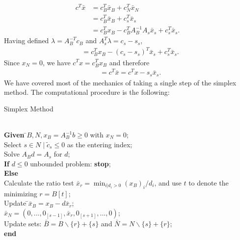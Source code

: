 \documentclass[a4paper,10 pt,titlepage,twoside]{book}
\theoremstyle{plain}
\theoremstyle{definition}
\theoremstyle{remark}
\begin{document}
\begin{align*}
c^{T}\bar{x} &=c^{T}_{B}\bar{x}_{B}+c^{T}_{N}\bar{x}_{N}\\
			 &=c_{B}^{T}\bar{x}_{B}+c^{T}_{s}\bar{x}_{s}\\
			 &=c_{B}^{T}x_{B}-c^{T}_{B}A_{B}^{-1}A_{s}\bar{x}_{s}+c_{s}^{T}\bar{x}_{s}.
\end{align*}
Having defined $ \lambda=A_{B}^{-T}c_{B}$ and $A^{T}_{s}\lambda = c_{s}-s_{s}$,
\begin{align*}
&= c^{T}_{B}x_{B}-(c_{s} -s_{s})^{T}\bar{x}_{s} +c_{s}^{T}\bar{x}_{s}.
\end{align*}
Since $x_{N}=0$, we have $c^{T}x=c^{T}_{B}x_{B}$ and therefore 
\begin{align*}
  &=c^{T}\bar{x} = c^{T}x - s_{s}\bar{x}_{s}.
\end{align*}
We have covered most of the mechanics of taking a single step of the simplex method. The computational procedure is the following:
\\
\begin{algorithm}[H]\caption{\label{Alg:1}Simplex Method}
\begin{tabbing}
	\\
	\textbf{Given} \=$B, N, x_{B} = A_{B}^{-1}b\geq 0$ with $x_{N}=0$;\\
	\> Select $s\in N\;|\;\widetilde{c}_{s}\leq 0$ as the entering index;\\
	\> Solve $A_{B}d = A_{s}$ for $d$;\\
	\>\textbf{If} {$d \leq 0$} unbounded problem: \textbf{stop};\\
	\>\textbf{Else} \=\\
	\>\>Calculate the ratio test $\bar{x}_{r} = \min_{i | d_{i} > 0}(x_{B})_{i}/d_{i}$, and use $t$ to denote the minimizing $r = B[t]$;\\
	\>\>Update \=$\bar{x}_{B} = x_{B}-d\bar{x}_{r}$;\\
	\>\>\>$\bar{x}_{N} = (0,...,0_{[s-1]},\bar{x}_{r},0_{[s+1]},...,0)$;\\
	\>\> Update sets: $\bar{B} = B \backslash \{r\} + \{s\}$ and $\bar{N} = N \backslash \{s\} + \{r\}$;\\
	\textbf{end}
\end{tabbing}
\end{algorithm}
\end{document}
